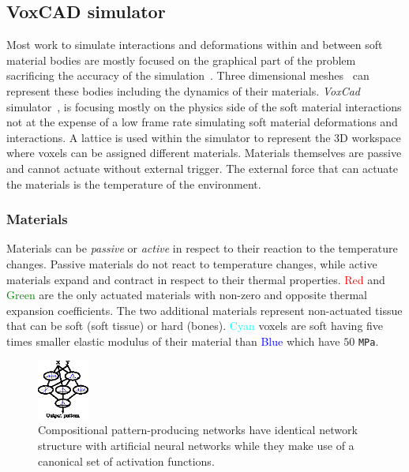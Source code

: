 \documentclass{sig-alternate}
\begin{document}
\subsection{VoxCAD simulator}

Most work to simulate interactions and deformations within and between soft material bodies are mostly focused on the graphical part of the problem~\cite{faloutsos1997dynamic} sacrificing the accuracy of the simulation~\cite{teschner2004versatile}. Three dimensional meshes~\cite{muller2002stable} can represent these bodies including the dynamics of their materials. \emph{VoxCad} simulator~\cite{hiller2012dynamic}, is focusing mostly on the physics side of the soft material interactions not at the expense of a low frame rate simulating soft material deformations and interactions. A lattice is used within the simulator to represent the 3D workspace where voxels can be assigned different materials. Materials themselves are passive and cannot actuate without external trigger. The external force that can actuate the materials is the temperature of the environment.

\subsubsection*{Materials}

Materials can be \emph{passive} or \emph{active} in respect to their reaction to the temperature changes. Passive materials do not react to temperature changes, while active materials expand and contract in respect to their thermal properties. \textcolor{Red}{Red} and \textcolor{Green}{Green} are the only actuated materials with non-zero and opposite thermal expansion coefficients. The two additional materials represent non-actuated tissue that can be soft (soft tissue) or hard (bones). \textcolor{Cyan}{Cyan} voxels are soft having five times smaller elastic modulus of their material than \textcolor{Blue}{Blue} which have $50$ \texttt{MPa}.

\begin{figure}[t!]
\centering
\includegraphics[width=0.15\textwidth]{../Figures/Misc/cppnNetwork.eps}
\caption{Compositional pattern-producing networks have identical network structure with artificial neural networks while they make use of a canonical set of activation functions.}
\label{fig:cppnNetwork}
\vspace{-15pt}
\end{figure}
\end{document}
